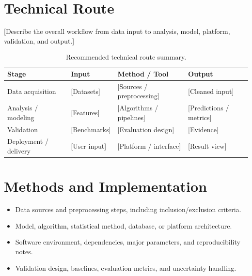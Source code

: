 \documentclass[11pt,a4paper]{article}
\newcommand{\placeholder}[1]{[#1]}
\begin{document}
\section{Technical Route}
\placeholder{Describe the overall workflow from data input to analysis, model, platform, validation, and output.}

\begin{table}[h]
\centering
\renewcommand{\arraystretch}{1.25}
\begin{tabularx}{\textwidth}{p{}X X X}
\toprule
\textbf{Stage} & \textbf{Input} & \textbf{Method / Tool} & \textbf{Output}\\
\midrule
Data acquisition & \placeholder{Datasets} & \placeholder{Sources / preprocessing} & \placeholder{Cleaned input}\\
Analysis / modeling & \placeholder{Features} & \placeholder{Algorithms / pipelines} & \placeholder{Predictions / metrics}\\
Validation & \placeholder{Benchmarks} & \placeholder{Evaluation design} & \placeholder{Evidence}\\
Deployment / delivery & \placeholder{User input} & \placeholder{Platform / interface} & \placeholder{Result view}\\
\bottomrule
\end{tabularx}
\caption{Recommended technical route summary.}
\end{table}

\section{Methods and Implementation}
\begin{itemize}
  \item Data sources and preprocessing steps, including inclusion/exclusion criteria.
  \item Model, algorithm, statistical method, database, or platform architecture.
  \item Software environment, dependencies, major parameters, and reproducibility notes.
  \item Validation design, baselines, evaluation metrics, and uncertainty handling.
\end{itemize}
\end{document}
